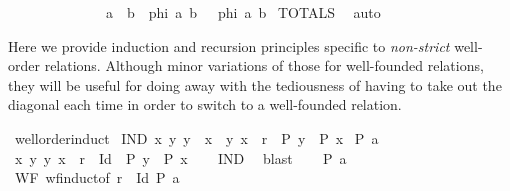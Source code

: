 \begin{isabellebody}
\ \ \ \ \ \ \ \ \ \ \ \ \ \ {\isacharparenleft}{\kern0pt}a\ {\isacharequal}{\kern0pt}\ b\ {\isasymLongrightarrow}\ phi\ a\ b{\isacharparenright}{\kern0pt}{\isasymrbrakk}\ \ {\isasymLongrightarrow}\ phi\ a\ b{\isachardoublequoteclose}\isanewline
%
\isadelimproof
%
\endisadelimproof
%
\isatagproof
{}\isamarkupfalse%
\ TOTALS\ \isamarkupfalse%
\ auto%
\endisatagproof
{\isafoldproof}%
%
\isadelimproof
%
\endisadelimproof
%
\isadelimdocument
%
\endisadelimdocument
%
\isatagdocument
%
\isamarkuptrue%
%
\endisatagdocument
{\isafolddocument}%
%
\isadelimdocument
%
\endisadelimdocument
%
\begin{isamarkuptext}%
Here we provide induction and recursion principles specific to {\em non-strict}
well-order relations.
Although minor variations of those for well-founded relations, they will be useful
for doing away with the tediousness of
having to take out the diagonal each time in order to switch to a well-founded relation.%
\end{isamarkuptext}\isamarkuptrue%
\isamarkupfalse%
\ well{\isacharunderscore}{\kern0pt}order{\isacharunderscore}{\kern0pt}induct{\isacharcolon}{\kern0pt}\isanewline
{}\ IND{\isacharcolon}{\kern0pt}\ {\isachardoublequoteopen}{\isasymAnd}x{\isachardot}{\kern0pt}\ {\isasymforall}y{\isachardot}{\kern0pt}\ y\ {\isasymnoteq}\ x\ {\isasymand}\ {\isacharparenleft}{\kern0pt}y{\isacharcomma}{\kern0pt}\ x{\isacharparenright}{\kern0pt}\ {\isasymin}\ r\ {\isasymlongrightarrow}\ P\ y\ {\isasymLongrightarrow}\ P\ x{\isachardoublequoteclose}\isanewline
{}\ {\isachardoublequoteopen}P\ a{\isachardoublequoteclose}\isanewline
%
\isadelimproof
%
\endisadelimproof
%
\isatagproof
{}\isamarkupfalse%
{\isacharminus}{\kern0pt}\isanewline
\ \ \isamarkupfalse%
\ {\isachardoublequoteopen}{\isasymAnd}x{\isachardot}{\kern0pt}\ {\isasymforall}y{\isachardot}{\kern0pt}\ {\isacharparenleft}{\kern0pt}y{\isacharcomma}{\kern0pt}\ x{\isacharparenright}{\kern0pt}\ {\isasymin}\ r\ {\isacharminus}{\kern0pt}\ Id\ {\isasymlongrightarrow}\ P\ y\ {\isasymLongrightarrow}\ P\ x{\isachardoublequoteclose}\isanewline
\ \ \isamarkupfalse%
\ IND\ \isamarkupfalse%
\ blast\isanewline
\ \ \isamarkupfalse%
\ {\isachardoublequoteopen}P\ a{\isachardoublequoteclose}\ \isamarkupfalse%
\ WF\ wf{\isacharunderscore}{\kern0pt}induct{\isacharbrackleft}{\kern0pt}of\ {\isachardoublequoteopen}r\ {\isacharminus}{\kern0pt}\ Id{\isachardoublequoteclose}\ P\ a{\isacharbrackright}{\kern0pt}\ \isamarkupfalse%

\end{isabellebody}
